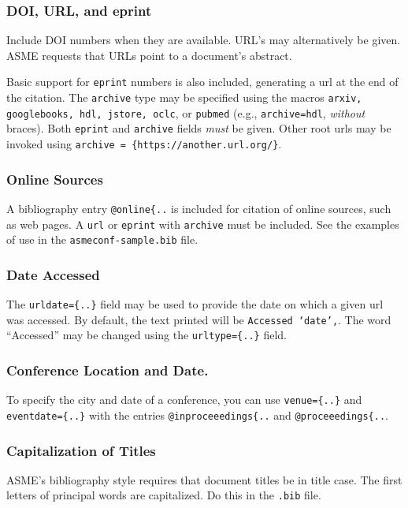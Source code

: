 \documentclass[captionpatch,colorlinks,upint,subscriptcorrection,varvw,german]{asmeconf}
\begin{document}
\subsubsection*{DOI, URL, and eprint} Include DOI numbers when they are available.  URL's may alternatively be given. ASME requests that URLs point to a document's abstract.

Basic support for \texttt{eprint} numbers is also included, generating a url at the end of the citation. The \texttt{archive} type may be specified using the macros \texttt{arxiv, google\-books, hdl, jstore, oclc}, or \texttt{pubmed} (e.g., \texttt{archive=hdl},  \textit{without} braces). Both \texttt{eprint} and \texttt{archive} fields \textit{must} be given. Other root urls may be invoked using \verb|archive = {https://another.url.org/}|.

\subsubsection*{Online Sources} A bibliography entry \verb|@online{..| is included for citation of online sources, such as web pages. A \texttt{url} or \texttt{eprint} with \texttt{archive} must be included. See the examples of use in the \texttt{asmeconf-sample.bib} file.

\subsubsection*{Date Accessed} The \verb|urldate={..}| field may be used to provide the date on which a given url was accessed. By default, the text printed will be \texttt{Accessed `date',}. The word ``Accessed'' may be changed using the \verb|urltype={..}| field.

\subsubsection*{Conference Location and Date.} To specify the city and date of a conference, you can use \verb|venue={..}| and \verb|eventdate={..}| with the entries \verb|@inproceeedings{..| and \verb|@proceeedings{..|.

\subsubsection*{Capitalization of Titles} ASME's bibliography style requires that document titles be in title case. The first letters of principal words are capitalized. Do this in the \texttt{.bib} file.
\end{document}

